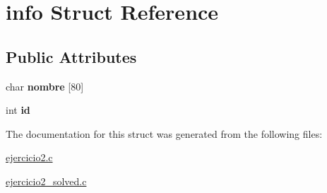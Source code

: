 \hypertarget{structinfo}{}\section{info Struct Reference}
\label{structinfo}
\subsection*{Public Attributes}
\begin{DoxyCompactItemize}
\item 
char {\bfseries nombre} \mbox{[}80\mbox{]}\hypertarget{structinfo_a0de2dc94039ebaa93065006cf9cbb172}{}\label{structinfo_a0de2dc94039ebaa93065006cf9cbb172}

\item 
int {\bfseries id}\hypertarget{structinfo_afe86f23d8bd5fd8d139e39a5b1a01171}{}\label{structinfo_afe86f23d8bd5fd8d139e39a5b1a01171}

\end{DoxyCompactItemize}


The documentation for this struct was generated from the following files\+:\begin{DoxyCompactItemize}
\item 
\hyperlink{ejercicio2_8c}{ejercicio2.\+c}\item 
\hyperlink{ejercicio2__solved_8c}{ejercicio2\+\_\+solved.\+c}\end{DoxyCompactItemize}
